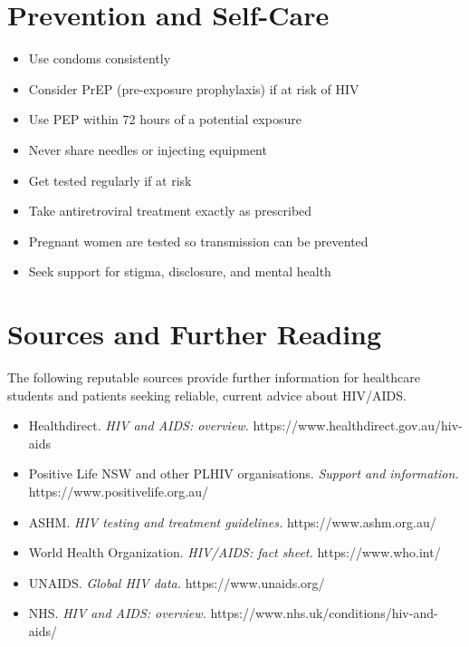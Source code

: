 \section*{Prevention and Self-Care}
\begin{itemize}
    \item Use condoms consistently
    \item Consider PrEP (pre-exposure prophylaxis) if at risk of HIV
    \item Use PEP within 72 hours of a potential exposure
    \item Never share needles or injecting equipment
    \item Get tested regularly if at risk
    \item Take antiretroviral treatment exactly as prescribed
    \item Pregnant women are tested so transmission can be prevented
    \item Seek support for stigma, disclosure, and mental health
\end{itemize}

\section*{Sources and Further Reading}
The following reputable sources provide further information for healthcare students and patients seeking reliable, current advice about HIV/AIDS.

\begin{itemize}
    \item Healthdirect. \textit{HIV and AIDS: overview.} https://www.healthdirect.gov.au/hiv-aids
    \item Positive Life NSW and other PLHIV organisations. \textit{Support and information.} https://www.positivelife.org.au/
    \item ASHM. \textit{HIV testing and treatment guidelines.} https://www.ashm.org.au/
    \item World Health Organization. \textit{HIV/AIDS: fact sheet.} https://www.who.int/
    \item UNAIDS. \textit{Global HIV data.} https://www.unaids.org/
    \item NHS. \textit{HIV and AIDS: overview.} https://www.nhs.uk/conditions/hiv-and-aids/
\end{itemize}
